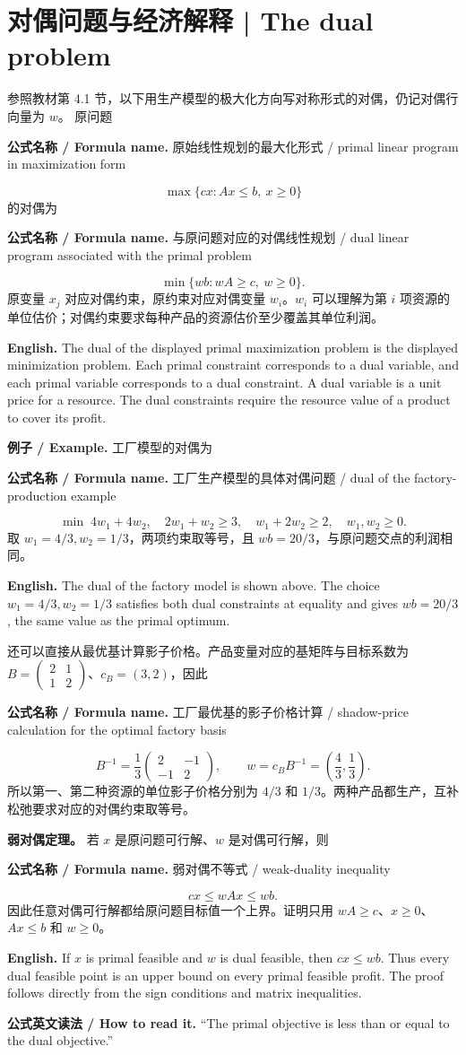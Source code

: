 \documentclass[UTF8,11pt,a4paper]{ctexart}
\newcommand{\EN}[1]{\par\noindent \textbf{English.} #1\par}
\newcommand{\READ}[1]{\par\noindent \textbf{公式英文读法 / How to read it.} #1\par}
\newcommand{\FORMULA}[2]{\par\noindent\textbf{公式名称 / Formula name.} #1 / #2\par}
\newcommand{\EX}[2]{\par\noindent \textbf{例子 / Example.} #1\par\EN{#2}}
\begin{document}
\section{对偶问题与经济解释 | The dual problem}
\noindent 参照教材第 4.1 节，以下用生产模型的极大化方向写对称形式的对偶，仍记对偶行向量为 $w$。
\noindent 原问题
\FORMULA{原始线性规划的最大化形式}{primal linear program in maximization form}
\[
\max\{cx:Ax\le b,\ x\ge0\}
\]
的对偶为
\FORMULA{与原问题对应的对偶线性规划}{dual linear program associated with the primal problem}
\[
\min\{wb:wA\ge c,\ w\ge0\}.
\]
原变量 $x_j$ 对应对偶约束，原约束对应对偶变量 $w_i$。$w_i$ 可以理解为第 $i$ 项资源的单位估价；对偶约束要求每种产品的资源估价至少覆盖其单位利润。
\EN{The dual of the displayed primal maximization problem is the displayed minimization problem. Each primal constraint corresponds to a dual variable, and each primal variable corresponds to a dual constraint. A dual variable is a unit price for a resource. The dual constraints require the resource value of a product to cover its profit.}
\EX{工厂模型的对偶为
\FORMULA{工厂生产模型的具体对偶问题}{dual of the factory-production example}
\[
\min\;4w_1+4w_2,\quad 2w_1+w_2\ge3,\quad w_1+2w_2\ge2,\quad w_1,w_2\ge0.
\]
取 $w_1=4/3,w_2=1/3$，两项约束取等号，且 $wb=20/3$，与原问题交点的利润相同。}{The dual of the factory model is shown above. The choice $w_1=4/3,w_2=1/3$ satisfies both dual constraints at equality and gives $wb=20/3$, the same value as the primal optimum.}
\noindent 还可以直接从最优基计算影子价格。产品变量对应的基矩阵与目标系数为 $B=\begin{pmatrix}2&1\\1&2\end{pmatrix}$、$c_B=(3,2)$，因此
\FORMULA{工厂最优基的影子价格计算}{shadow-price calculation for the optimal factory basis}
\[
B^{-1}=\frac13\begin{pmatrix}2&-1\\-1&2\end{pmatrix},\qquad
w=c_BB^{-1}=\left(\frac43,\frac13\right).
\]
所以第一、第二种资源的单位影子价格分别为 $4/3$ 和 $1/3$。两种产品都生产，互补松弛要求对应的对偶约束取等号。

\noindent\textbf{弱对偶定理。} 若 $x$ 是原问题可行解、$w$ 是对偶可行解，则
\FORMULA{弱对偶不等式}{weak-duality inequality}
\[
cx\le wAx\le wb.
\]
因此任意对偶可行解都给原问题目标值一个上界。证明只用 $wA\ge c$、$x\ge0$、$Ax\le b$ 和 $w\ge0$。
\EN{If $x$ is primal feasible and $w$ is dual feasible, then $cx\le wb$. Thus every dual feasible point is an upper bound on every primal feasible profit. The proof follows directly from the sign conditions and matrix inequalities.}
\READ{“The primal objective is less than or equal to the dual objective.”}
\end{document}
